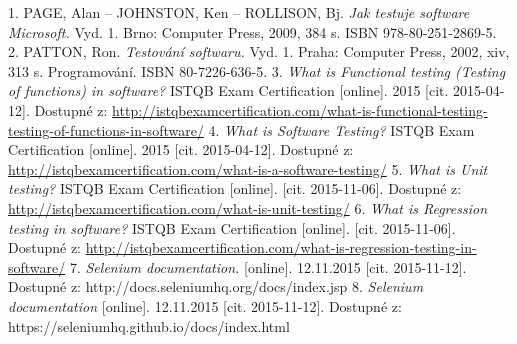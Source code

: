 \documentclass[
    color,   %
	table,   %
    twoside, %
]{fithesis3}
\begin{document}
  \renewcommand{\refname}{Seznam literatury}
  \begin{thebibliography}{9}
  1. PAGE, Alan – JOHNSTON, Ken – ROLLISON, Bj. \emph{Jak testuje software Microsoft.} Vyd. 1. Brno: Computer Press, 2009, 384 s. ISBN 978-80-251-2869-5.
  2. PATTON, Ron. \emph{Testování softwaru.} Vyd. 1. Praha: Computer Press, 2002, xiv, 313 s. Programování. ISBN 80-7226-636-5. 
  3. \emph{What is Functional testing (Testing of functions) in software?} ISTQB Exam Certification [online]. 2015 [cit. 2015-04-12]. Dostupné z: \url{http://istqbexamcertification.com/what-is-functional-testing-testing-of-functions-in-software/}
  4. \emph{What is Software Testing?} ISTQB Exam Certification [online]. 2015 [cit. 2015-04-12]. Dostupné z: \url{http://istqbexamcertification.com/what-is-a-software-testing/}
  5. \emph{What is Unit testing?} ISTQB Exam Certification [online]. [cit. 2015-11-06]. Dostupné z: \url{http://istqbexamcertification.com/what-is-unit-testing/}
  6. \emph{What is Regression testing in software?} ISTQB Exam Certification [online]. [cit. 2015-11-06]. Dostupné z: \url{http://istqbexamcertification.com/what-is-regression-testing-in-software/}
  7. \emph{Selenium documentation.} [online]. 12.11.2015 [cit. 2015-11-12]. Dostupné z: http://docs.seleniumhq.org/docs/index.jsp
  8. \emph{Selenium documentation} [online]. 12.11.2015 [cit. 2015-11-12]. Dostupné z: https://seleniumhq.github.io/docs/index.html
  \end{thebibliography}
\end{document}
